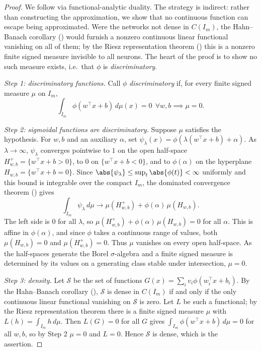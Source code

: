 \begin{proof}
We follow \citet{cybenko1989} via functional-analytic duality. The strategy is
indirect: rather than constructing the approximation, we show that no continuous
function can escape being approximated. Were the networks not dense in $C(I_m)$,
the Hahn--Banach corollary () would furnish a nonzero
continuous linear functional vanishing on all of them; by the Riesz
representation theorem () this is a nonzero finite signed
measure invisible to all neurons. The heart of the proof is to show no such
measure exists, i.e.\ that $\phi$ is \emph{discriminatory}.

\emph{Step 1: discriminatory functions.} Call $\phi$ \emph{discriminatory} if,
for every finite signed measure $\mu$ on $I_m$,
\[
  \int_{I_m} \phi(w^\top x + b)\, d\mu(x) = 0 \ \ \forall w, b
  \implies \mu = 0.
\]

\emph{Step 2: sigmoidal functions are discriminatory.} Suppose $\mu$ satisfies
the hypothesis. For $w, b$ and an auxiliary $\alpha$, set
$\psi_\lambda(x) = \phi(\lambda(w^\top x + b) + \alpha)$. As $\lambda \to \infty$,
$\psi_\lambda$ converges pointwise to $1$ on the open half-space
$H^+_{w,b} = \{w^\top x + b > 0\}$, to $0$ on $\{w^\top x + b < 0\}$, and to
$\phi(\alpha)$ on the hyperplane $H_{w,b} = \{w^\top x + b = 0\}$. Since
$\abs{\psi_\lambda} \le \sup_t \abs{\phi(t)} < \infty$ uniformly and this bound is
integrable over the compact $I_m$, the dominated convergence theorem
() gives
\[
  \int_{I_m}\psi_\lambda\, d\mu \to \mu(H^+_{w,b}) + \phi(\alpha)\,\mu(H_{w,b}).
\]
The left side is $0$ for all $\lambda$, so
$\mu(H^+_{w,b}) + \phi(\alpha)\,\mu(H_{w,b}) = 0$ for all $\alpha$. This is affine
in $\phi(\alpha)$, and since $\phi$ takes a continuous range of values, both
$\mu(H_{w,b}) = 0$ and $\mu(H^+_{w,b}) = 0$. Thus $\mu$ vanishes on every open
half-space. As the half-spaces generate the Borel $\sigma$-algebra and a finite
signed measure is determined by its values on a generating class stable under
intersection, $\mu = 0$.

\emph{Step 3: density.} Let $\mathcal{S}$ be the set of functions
$G(x) = \sum_i v_i \phi(w_i^\top x + b_i)$. By the Hahn--Banach corollary
(), $\mathcal{S}$ is dense in $C(I_m)$ if and only if the only
continuous linear functional vanishing on $\mathcal{S}$ is zero. Let $L$ be such
a functional; by the Riesz representation theorem there is a finite signed
measure $\mu$ with $L(h) = \int_{I_m} h\, d\mu$. Then $L(G) = 0$ for all $G$
gives $\int_{I_m}\phi(w^\top x + b)\, d\mu = 0$ for all $w, b$, so by Step 2
$\mu = 0$ and $L = 0$. Hence $\mathcal{S}$ is dense, which is the assertion.
\end{proof}

